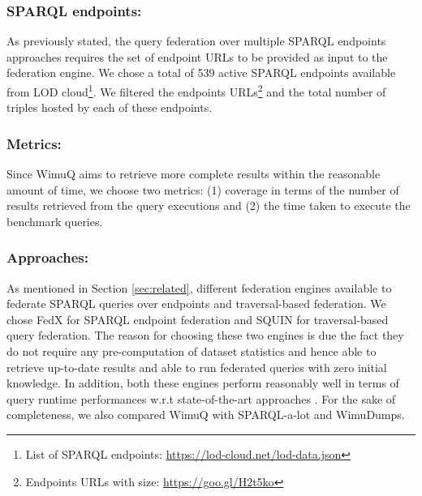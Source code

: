 \documentclass[sw]{iosart2x}
\begin{document}
\subsubsection{SPARQL endpoints:} As previously stated, the query federation over multiple SPARQL endpoints approaches requires the set of endpoint URLs to be provided as input to the federation engine. We chose a total of 539 active SPARQL endpoints available from LOD cloud\footnote{List of SPARQL endpoints: \url{https://lod-cloud.net/lod-data.json}}. We filtered the endpoints URLs\footnote{\label{endpoints}Endpoints URLs with size: \url{https://goo.gl/H2t5ko}} and the total number of triples hosted by each of these endpoints. 

\subsubsection{Metrics:} Since WimuQ aims to retrieve more complete results within the reasonable amount of time, we choose two metrics: (1) coverage in terms of the number of results retrieved from the query executions and (2) the time taken to execute the benchmark queries. 

\subsubsection{Approaches:} As mentioned in Section \ref{sec:related}, different federation engines available to federate SPARQL queries over endpoints and traversal-based federation. We chose FedX \cite{fedx2011} for SPARQL endpoint federation and SQUIN \cite{hartig2013squin} for traversal-based query federation. The reason for choosing these two engines is due the fact they do not require any pre-computation of dataset statistics and hence able to retrieve up-to-date results and able to run federated queries with zero initial knowledge. In addition, both these engines perform reasonably well in terms of query runtime performances w.r.t state-of-the-art approaches \cite{saleem2015fine,saleem2018costfed,hartig2013squin}. For the sake of completeness, we also compared WimuQ with SPARQL-a-lot and WimuDumps.  

\end{document}
